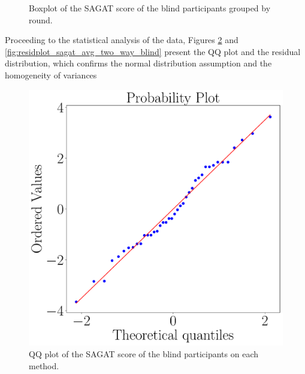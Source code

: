 \begin{figure}[!htb]
\begin{minipage}{0.45\textwidth}
        \caption{Boxplot of the SAGAT score of the blind participants grouped by round.}
        \label{fig:boxplot_sagat_blind_rounds}
    \end{minipage}
\end{figure}


Proceeding to the statistical analysis of the data, Figures \ref{fig:qqplot_sagat_avg_two_way_blind} and \ref{fig:residplot_sagat_avg_two_way_blind} present the QQ plot and the residual distribution, which confirms the normal distribution assumption and the homogeneity of variances

\begin{figure}[!htb]
    \centering
    \begin{minipage}{0.45\textwidth}
        \centering
        \includegraphics[width = 0.8\linewidth]{Resultados/Sagat/Figuras/pdf/qqplot_sagat_avg_two_way_blind.pdf}
        \caption{QQ plot of the SAGAT score of the blind participants on each method.}
        \label{fig:qqplot_sagat_avg_two_way_blind}
    \end{minipage}
    \begin{minipage}{0.075\textwidth}
        \hfill
    \end{minipage}
    \begin{minipage}{0.45\textwidth}
        \centering

\end{minipage}
\end{figure}
